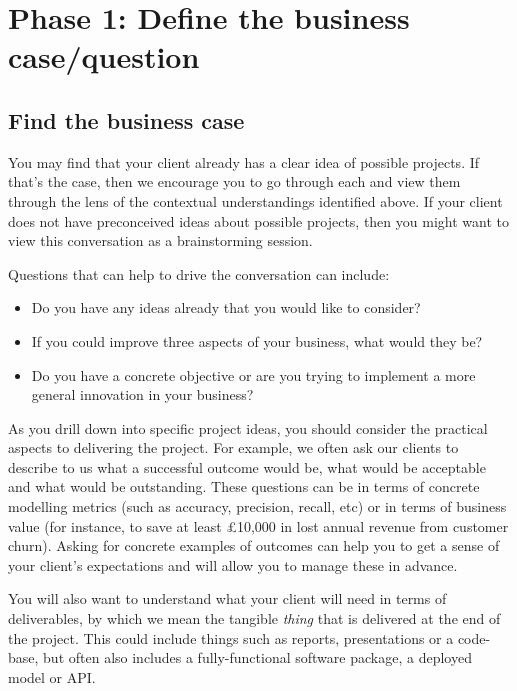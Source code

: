 \documentclass[
]{book}
\providecommand{\tightlist}{%
  \setlength{\itemsep}{0pt}\setlength{\parskip}{0pt}}
\begin{document}
\hypertarget{phase-1-define-the-business-casequestion}{%
\section{Phase 1: Define the business
case/question}\label{phase-1-define-the-business-casequestion}}

\hypertarget{find-the-business-case}{%
\subsection{Find the business case}\label{find-the-business-case}}

You may find that your client already has a clear idea of possible
projects. If that's the case, then we encourage you to go through each
and view them through the lens of the contextual understandings
identified above. If your client does not have preconceived ideas about
possible projects, then you might want to view this conversation as a
brainstorming session.

Questions that can help to drive the conversation can include:

\begin{itemize}
\tightlist
\item
  Do you have any ideas already that you would like to consider?
\item
  If you could improve three aspects of your business, what would they
  be?
\item
  Do you have a concrete objective or are you trying to implement a more
  general innovation in your business?
\end{itemize}

As you drill down into specific project ideas, you should consider the
practical aspects to delivering the project. For example, we often ask
our clients to describe to us what a successful outcome would be, what
would be acceptable and what would be outstanding. These questions can
be in terms of concrete modelling metrics (such as accuracy, precision,
recall, etc) or in terms of business value (for instance, to save at
least £10,000 in lost annual revenue from customer churn). Asking for
concrete examples of outcomes can help you to get a sense of your
client's expectations and will allow you to manage these in advance.

You will also want to understand what your client will need in terms of
deliverables, by which we mean the tangible \emph{thing} that is
delivered at the end of the project. This could include things such as
reports, presentations or a code-base, but often also includes a
fully-functional software package, a deployed model or API.
\end{document}
